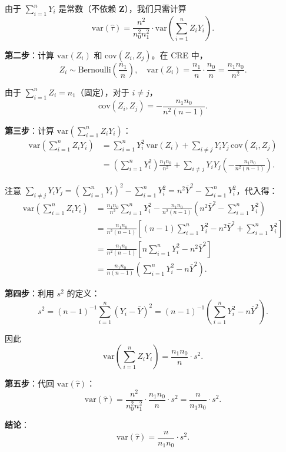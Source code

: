 由于 $\sum_{i=1}^n Y_i$ 是常数（不依赖 $\mathbf{Z}$），我们只需计算
\[
\text{var}(\hat{\tau}) = \frac{n^2}{n_0^2 n_1^2} \cdot \text{var}\left( \sum_{i=1}^n Z_i Y_i \right) .
\]

\textbf{第二步}：计算 $\text{var}(Z_i)$ 和 $\text{cov}(Z_i, Z_j)$。在 CRE 中，
\[
Z_i \sim \text{Bernoulli}\left(\frac{n_1}{n}\right), \quad \text{var}(Z_i) = \frac{n_1}{n} \cdot \frac{n_0}{n} = \frac{n_1 n_0}{n^2} .
\]

由于 $\sum_{i=1}^n Z_i = n_1$（固定），对于 $i \neq j$，
\[
\text{cov}(Z_i, Z_j) = -\frac{n_1 n_0}{n^2 (n-1)} .
\]

\textbf{第三步}：计算 $\text{var}\left( \sum_{i=1}^n Z_i Y_i \right)$：
\begin{align*}
\text{var}\left( \sum_{i=1}^n Z_i Y_i \right)
&= \sum_{i=1}^n Y_i^2 \, \text{var}(Z_i) + \sum_{i \neq j} Y_i Y_j \, \text{cov}(Z_i, Z_j) \\
&= \left( \sum_{i=1}^n Y_i^2 \right) \frac{n_1 n_0}{n^2} + \sum_{i \neq j} Y_i Y_j \left( -\frac{n_1 n_0}{n^2 (n-1)} \right) .
\end{align*}

注意 $\sum_{i \neq j} Y_i Y_j = \left( \sum_{i=1}^n Y_i \right)^2 - \sum_{i=1}^n Y_i^2 = n^2 \bar{Y}^2 - \sum_{i=1}^n Y_i^2$，代入得：
\begin{align*}
\text{var}\left( \sum_{i=1}^n Z_i Y_i \right)
&= \frac{n_1 n_0}{n^2} \sum_{i=1}^n Y_i^2 - \frac{n_1 n_0}{n^2 (n-1)} \left( n^2 \bar{Y}^2 - \sum_{i=1}^n Y_i^2 \right) \\
&= \frac{n_1 n_0}{n^2 (n-1)} \left[ (n-1) \sum_{i=1}^n Y_i^2 - n^2 \bar{Y}^2 + \sum_{i=1}^n Y_i^2 \right] \\
&= \frac{n_1 n_0}{n^2 (n-1)} \left[ n \sum_{i=1}^n Y_i^2 - n^2 \bar{Y}^2 \right] \\
&= \frac{n_1 n_0}{n (n-1)} \left( \sum_{i=1}^n Y_i^2 - n \bar{Y}^2 \right) .
\end{align*}

\textbf{第四步}：利用 $s^2$ 的定义：
\[
s^2 = (n-1)^{-1} \sum_{i=1}^n (Y_i - \bar{Y})^2 = (n-1)^{-1} \left( \sum_{i=1}^n Y_i^2 - n \bar{Y}^2 \right) .
\]

因此
\[
\text{var}\left( \sum_{i=1}^n Z_i Y_i \right) = \frac{n_1 n_0}{n} \cdot s^2 .
\]

\textbf{第五步}：代回 $\text{var}(\hat{\tau})$：
\[
\text{var}(\hat{\tau}) = \frac{n^2}{n_0^2 n_1^2} \cdot \frac{n_1 n_0}{n} \cdot s^2 = \frac{n}{n_1 n_0} \cdot s^2 .
\]

\textbf{结论}：
\[
\boxed{ \text{var}(\hat{\tau}) = \frac{n}{n_1 n_0} \cdot s^2 } .
\]

